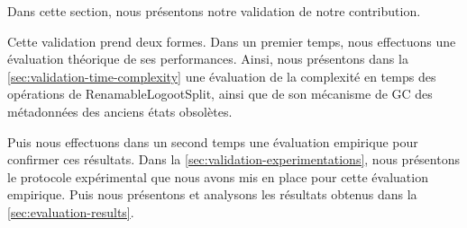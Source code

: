 Dans cette section, nous présentons notre validation de notre contribution.

Cette validation prend deux formes.
Dans un premier temps, nous effectuons une évaluation théorique de ses performances.
Ainsi, nous présentons dans la \autoref{sec:validation-time-complexity} une évaluation de la complexité en temps des opérations de RenamableLogootSplit, ainsi que de son mécanisme de \ac{GC} des métadonnées des anciens états obsolètes.

Puis nous effectuons dans un second temps une évaluation empirique pour confirmer ces résultats.
Dans la \autoref{sec:validation-experimentations}, nous présentons le protocole expérimental que nous avons mis en place pour cette évaluation empirique.
Puis nous présentons et analysons les résultats obtenus dans la \autoref{sec:evaluation-results}.
